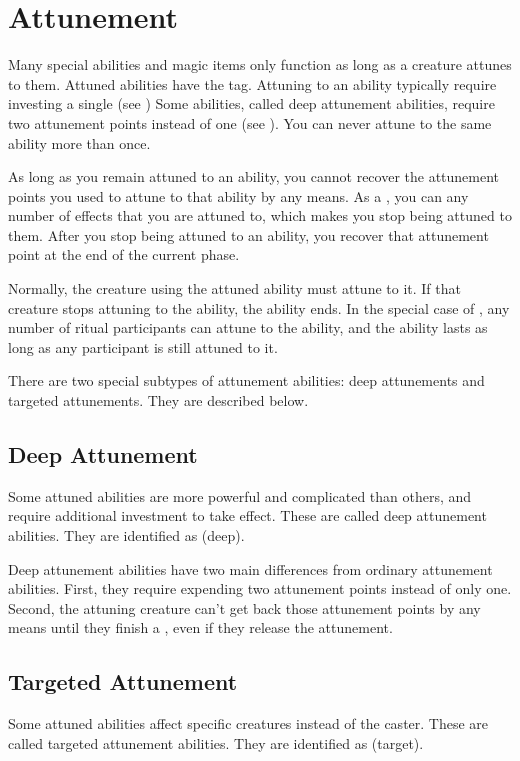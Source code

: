 \section{Attunement}\label{Attunement}
    Many special abilities and magic items only function as long as a creature attunes to them.
    Attuned abilities have the  tag.
    Attuning to an ability typically require investing a single  (see )
    Some abilities, called deep attunement abilities, require two attunement points instead of one (see ).
    You can never attune to the same ability more than once.

    As long as you remain attuned to an ability, you cannot recover the attunement points you used to attune to that ability by any means.
    As a , you can  any number of effects that you are attuned to, which makes you stop being attuned to them.
    After you stop being attuned to an ability, you recover that attunement point at the end of the current phase.

    Normally, the creature using the attuned ability must attune to it.
    If that creature stops attuning to the ability, the ability ends.
    In the special case of , any number of ritual participants can attune to the ability, and the ability lasts as long as any participant is still attuned to it.

    There are two special subtypes of attunement abilities: deep attunements and targeted attunements.
    They are described below.

    \subsection{Deep Attunement}\label{Deep Attunement}
        Some attuned abilities are more powerful and complicated than others, and require additional investment to take effect.
        These are called deep attunement abilities.
        They are identified as  (deep).

        Deep attunement abilities have two main differences from ordinary attunement abilities.
        First, they require expending two attunement points instead of only one.
        Second, the attuning creature can't get back those attunement points by any means until they finish a , even if they release the attunement.

    \subsection{Targeted Attunement}\label{Targeted Attunement}
        Some attuned abilities affect specific creatures instead of the caster.
        These are called targeted attunement abilities.
        They are identified as  (target).

